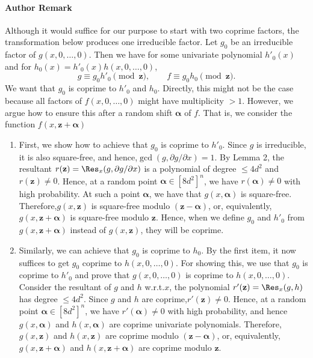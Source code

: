 \paragraph{Author Remark}
Although it would suffice for our purpose to start with two coprime factors, the transformation below produces one irreducible factor.
Let $g_0$ be an irreducible factor of $g(x,0,\ldots,0)$. Then we have for some univariate polynomial $h'_0(x)$ and for $h_0(x)=h'_0(x)h(x,0,\ldots,0)$,
\[g\equiv g_0h'_0\pmod{\mathbf z},\qquad f\equiv g_0h_0\pmod{\mathbf z}.\]
We want that $g_0$ is coprime to $h'_0$ and $h_0$. Directly, this might not be the case because all factors of $f(x,0,\ldots,0)$ might have multiplicity $>1$. However, we argue how to ensure this after a random shift $\boldsymbol\alpha$ of $f$. That is, we consider the function $f(x,\mathbf z+\boldsymbol\alpha)$
\begin{enumerate}
\item First, we show how to achieve that $g_0$ is coprime to $h'_0$.
Since $g$ is irreducible, it is also square-free, and hence,$\gcd(g,\partial g/\partial x)=1$. By Lemma 2, the resultant $r(\mathbf z)=\Res_x(g,\partial g/\partial x)$ is a polynomial of degree $\leq4d^2$ and $r(\mathbf z)\ne0$. Hence, at a random point $\boldsymbol\alpha\in[8d^2]^n$, we have $r(\boldsymbol\alpha)\ne0$ with high probability. At such a point $\boldsymbol\alpha$, we have that $g(x,\boldsymbol\alpha)$ is square-free. Therefore,$g(x,\mathbf z)$ is square-free modulo $(\mathbf z-\boldsymbol\alpha)$, or, equivalently,$g(x,\mathbf z+\boldsymbol\alpha)$ is square-free modulo $\mathbf z$. Hence, when we define $g_0$ and $h'_0$ from $g(x,\mathbf z+\boldsymbol\alpha)$ instead of $g(x,\mathbf z)$, they will be coprime.
\item Similarly, we can achieve that $g_0$ is coprime to $h_0$. By the first item, it now suffices to get $g_0$ coprime to $h(x,0,\ldots,0)$.
For showing this, we use that $g_0$ is coprime to $h'_0$ and prove that $g(x,0,\ldots,0)$ is coprime to $h(x,0,\ldots,0)$. Consider the resultant of $g$ and $h$ w.r.t.$x$, the polynomial $r'(\mathbf z)=\Res_x(g,h)$ has degree $\leq4d^2$. Since $g$ and $h$ are coprime,$r'(\mathbf z)\ne0$. Hence, at a random point $\boldsymbol\alpha\in[8d^2]^n$, we have $r'(\boldsymbol\alpha)\ne0$ with high probability, and hence $g(x,\boldsymbol\alpha)$ and $h(x,\boldsymbol\alpha)$ are coprime univariate polynomials. Therefore,$g(x,\mathbf z)$ and $h(x,\mathbf z)$ are coprime modulo $(\mathbf z-\boldsymbol\alpha)$, or, equivalently,$g(x,\mathbf z+\boldsymbol\alpha)$ and $h(x,\mathbf z+\boldsymbol\alpha)$ are coprime modulo $\mathbf z$.
\end{enumerate}
